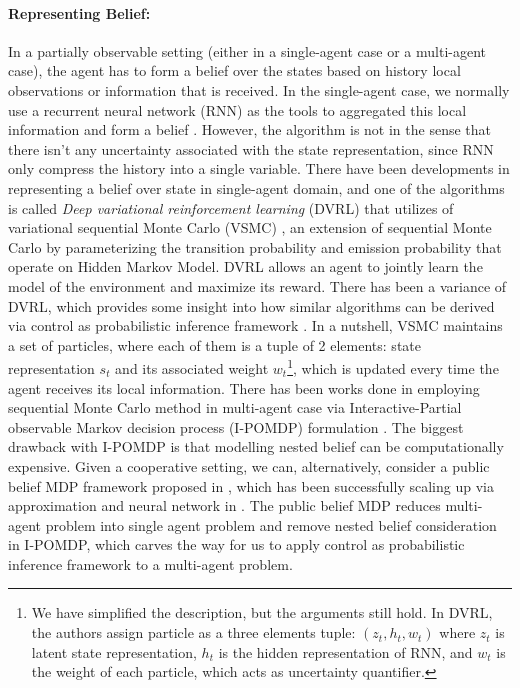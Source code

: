 \paragraph{Representing Belief:} In a partially observable setting (either in a single-agent case or a multi-agent case), the agent has to form a belief over the states based on history local observations or information that is received. In the single-agent case, we normally use a recurrent neural network (RNN) as the tools to aggregated this local information and form a belief \cite{hausknecht2015deep}. However, the algorithm is not  in the sense that there isn't any uncertainty associated with the state representation, since RNN only compress the history into a single variable. There have been developments in representing a belief over state in single-agent domain, and one of the algorithms is called \textit{Deep variational reinforcement learning} (DVRL) \cite{igl2018deep} that utilizes of variational sequential Monte Carlo (VSMC) \cite{le2017auto, maddison2017filtering, naesseth2017variational}, an extension of sequential Monte Carlo \cite{doucet2001introduction} by parameterizing the transition probability and emission probability that operate on Hidden Markov Model. DVRL allows an agent to jointly learn the model of the environment and maximize its reward. There has been a variance of DVRL, which provides some insight into how similar algorithms can be derived via control as probabilistic inference framework \cite{shvechikovjoint}. In a nutshell, VSMC maintains a set of particles, where each of them is a tuple of 2 elements: state representation $s_t$ and its associated weight $w_t$\footnote{We have simplified the description, but the arguments still hold. In DVRL, the authors assign particle as a three elements tuple: $(z_t, h_t, w_t)$ where $z_t$ is latent state representation, $h_t$ is the hidden representation of RNN, and $w_t$ is the weight of each particle, which acts as uncertainty quantifier.}, which is updated every time the agent receives its local information. There has been works done in employing sequential Monte Carlo method in multi-agent case \cite{doshi2009monte} via Interactive-Partial observable Markov decision process (I-POMDP) formulation \cite{gmytrasiewicz2005framework}. The biggest drawback with I-POMDP is that modelling nested belief can be computationally expensive. Given a cooperative setting, we can, alternatively, consider a public belief MDP framework proposed in \cite{nayyar2013decentralized}, which has been successfully scaling up via approximation and neural network in \cite{foerster2018bayesian, hu2019simplified}. The public belief MDP reduces multi-agent problem into single agent problem and remove nested belief consideration in I-POMDP, which carves the way for us to apply control as probabilistic inference framework to a multi-agent problem. 

